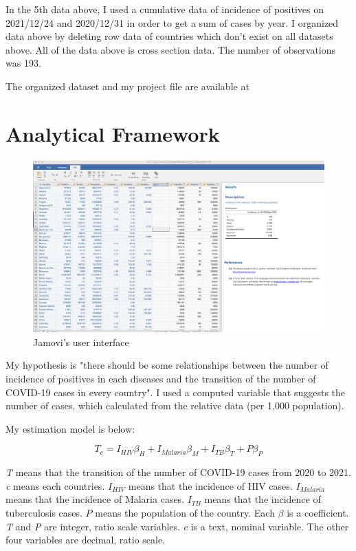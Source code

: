\documentclass[12pt]{report}
\begin{document}
In the 5th data above, I used a cumulative data of incidence of positives on 2021/12/24 and 2020/12/31 in order to get a sum of cases by year.
I organized data above by deleting row data of countries which don't exist on all datasets above.
All of the data above is cross section data. 
The number of observations was 193.


The organized dataset and my project file are available at \cite{}

\chapter{Analytical Framework}

\begin{figure}
    \centering
    \includegraphics[width=140mm]{img/jamovi.png}
    \caption{Jamovi's user interface}
    \label{fig:jamovi}
\end{figure}

My hypothesis is "there should be some relationships between the number of incidence of positives in each diseases and the transition of the number of COVID-19 cases in every country".
I used a computed variable that suggests the number of cases, which calculated from the relative data (per 1,000 population).

My estimation model is below:

\begin{equation}
    T_c = I_{HIV}\beta_H + I_{Malaria}\beta_M + I_{TB}\beta_T + P\beta_P
\end{equation}

{\it{T}} means that the transition of the number of COVID-19 cases from 2020 to 2021.
{\it{c}} means each countries.
{\it{$I_{HIV}$}} means that the incidence of HIV cases.
{\it{$I_{Malaria}$}} means that the incidence of Malaria cases.
{\it{$I_{TB}$}} means that the incidence of tuberculosis cases.
{\it{$P$}} means the population of the country.
Each {$\beta$} is a coefficient.
{\it{T}} and {\it{P}} are integer, ratio scale variables.
{\it{c}} is a text, nominal variable.
The other four variables are decimal, ratio scale.
\end{document}
